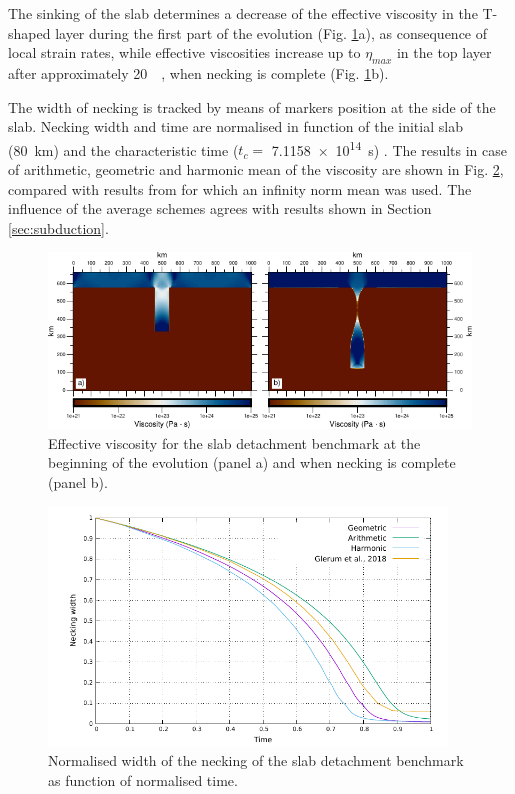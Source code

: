 \documentclass[hidelinks,10pt,a4paper]{article}
\begin{document}
The sinking of the slab determines a decrease of the effective viscosity in the T-shaped layer during the first part of the evolution (Fig. \ref{fig:slab}a),
as consequence of local strain rates, while effective viscosities increase up to $\eta_{max}$ in the top layer after approximately \SI{20}{\mega\year}, when
necking is complete (Fig. \ref{fig:slab}b).

The width of necking is tracked by means of markers position at the side of the slab. Necking width and time are normalised in function of the initial slab
(\SI{80}{\km}) and the characteristic time ($t_c=$ \SI{7.1158e14}{\s}) \citep{Schmalholz2011,Glerum2018}. The results in case of arithmetic, geometric and
harmonic mean of the viscosity are shown in Fig. \ref{fig:necking}, compared with results from \citet{Glerum2018} for which an infinity norm mean was used.
The influence of the average schemes agrees with results shown in Section \ref{sec:subduction}.

\begin{figure}
\noindent\includegraphics[width=\textwidth]{./Figures/Slab.pdf}
\caption{Effective viscosity for the slab detachment benchmark at the beginning of the evolution (panel a) and when necking is complete (panel b).}
\label{fig:slab}
\end{figure}

\begin{figure}
\centering
\noindent\includegraphics[width=400px]{./Figures/Necking.pdf}
\caption{Normalised width of the necking of the slab detachment benchmark as function of normalised time.}
\label{fig:necking}
\end{figure}
\end{document}

